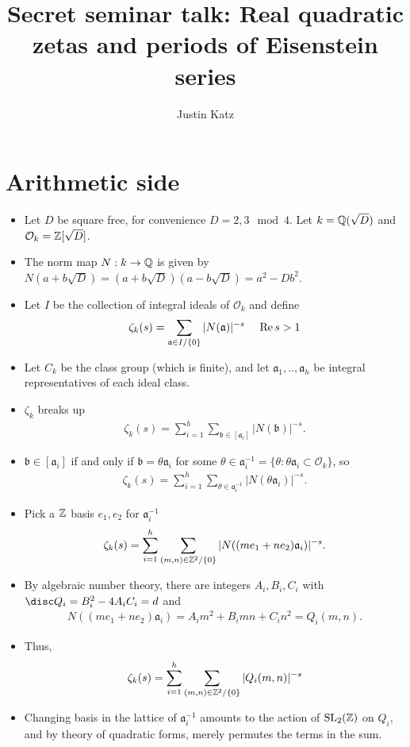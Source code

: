 \documentclass[11pt]{amsart}
\title{Secret seminar talk: Real quadratic zetas and periods of Eisenstein series}
\author{Justin Katz}
\newcommand{\Of}{\mathcal{O}}
\renewcommand{\a}{\mathfrak{a}}
\renewcommand{\b}{\mathfrak{b}}
\begin{document}
\maketitle
\section{Arithmetic side}
\begin{itemize}
	\item Let $D$ be square free, for convenience $D=2,3 \mod 4$. Let $k=\mathbb{Q}(\sqrt{D})$ and $\Of_{k}=\Z[\sqrt{D}]$.
	\item The norm map $N:k\to \mathbb{Q}$ is given by $N(a+b\sqrt{D})=(a+b\sqrt{D})(a-b\sqrt{D})=a^{2}-Db^{2}$. 
	\item Let $I$ be the collection of integral ideals of $\Of_{k}$ and define
		\begin{align*}
			\zeta_{k}(s)=\sum_{\a \in I/\{0\}}|N(\a)|^{-s} \quad \text{ $\re s>1$}
		\end{align*}
	\item Let $C_{k}$ be the class group (which is finite), and let $\a_{1},..,\a_{h}$ be integral representatives of each ideal class.
	\item $\zeta_{k}$ breaks up 
		\begin{align*}
			\zeta_{k}(s)=\sum_{i=1}^{h}\sum_{\b \in [\a_{i}]}|N(\b)|^{-s}.
		\end{align*}
	\item $\b \in [\a_{i}]$ if and only if $\b=\theta \a_{i}$ for some $\theta \in \a_{i}^{-1}=\{\theta: \theta \a_{i} \subset \Of_{k}\}$, so 
		\begin{align*}
			\zeta_{k}(s)=\sum_{i=1}^{h}\sum_{\theta \in \a^{-1}_{i}}|N(\theta \a_{i})|^{-s}.
		\end{align*}
	\item Pick a $\mathbb{Z}$ basis $e_{1},e_{2}$ for $\a_{i}^{-1}$
		\begin{align*}
			\zeta_{k}(s)=\sum_{i=1}^{h}\sum_{(m,n) \in \Z^{2}/ \{0\}}|N((me_{1}+ne_{2})\a_{i})|^{-s}.
		\end{align*}
	\item By algebraic number theory, there are integers $A_{i},B_{i},C_{i}$ with $\disc Q_{i} = B_{i}^{2}-4A_{i}C_{i}=d$ and
		\begin{align*}
			N((me_{1}+ne_{2})\a_{i})=A_{i}m^{2}+B_{i}mn+C_{i}n^{2}=Q_{i}(m,n).
		\end{align*}
	\item Thus,
		\begin{align*}
			\zeta_{k}(s)=\sum_{i=1}^{h}\sum_{(m,n) \in \mathbb{Z}^{2}/ \{0\}}|Q_{i}(m,n)|^{-s}
		\end{align*} 
	\item Changing basis in the lattice of $\a_{i}^{-1}$  amounts to the action of $\operatorname{SL}_{2}(\mathbb{Z})$ on $Q_{i}$, and by theory of quadratic forms, merely permutes the terms in the sum. 
\end{itemize}
\end{document}
